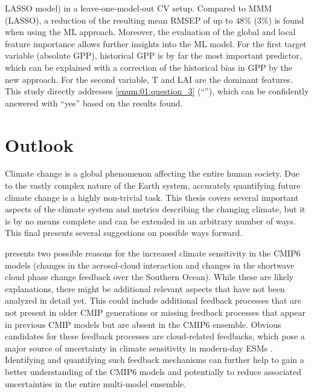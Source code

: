 \ac{LASSO} model) in a leave‐one‐model‐out \ac{CV} setup. Compared to \ac{MMM}
(\ac{LASSO}), a reduction of the resulting mean \ac{RMSEP} of up to $48
\unit{\%}$ ($3 \unit{\%}$) is found when using the \ac{ML} approach. Moreover,
the evaluation of the global and local feature importance allows further
insights into the \ac{ML} model. For the first target variable (absolute
\ac{GPP}), historical \ac{GPP} is by far the most important predictor, which
can be explained with a correction of the historical bias in \ac{GPP} by the
new approach. For the second variable, \ac{T} and \ac{LAI} are the dominant
features. This study directly addresses \cref{enum:01:question_3}
(\enquote{\emph{\KeyScienceQuestionThree{}}}), which can be confidently
answered with \enquote{yes} based on the results found.


\section{Outlook}
\label{sec:07:outlook}

Climate change is a global phenomenon affecting the entire human society. Due
to the vastly complex nature of the Earth system, accurately quantifying future
climate change is a highly non-trivial task. This thesis covers several
important aspects of the climate system and metrics describing the changing
climate, but it is by no means complete and can be extended in an arbitrary
number of ways. This final  presents several
suggestions on possible ways forward.

 presents two possible reasons for the
increased climate sensitivity in the \acs{CMIP}6 models (changes in the
aerosol-cloud interaction and changes in the shortwave cloud phase change
feedback over the Southern Ocean). While these are likely explanations, there
might be additional relevant aspects that have not been analyzed in detail yet.
This could include additional feedback processes that are not present in older
\ac{CMIP} generations or missing feedback processes that appear in previous
\ac{CMIP} models but are absent in the \acs{CMIP}6 ensemble. Obvious candidates
for these feedback processes are cloud-related feedbacks, which pose a major
source of uncertainty in climate sensitivity in modern-day \acp{ESM}
\autocite{Boucher2013}. Identifying and quantifying such feedback mechanisms
can further help to gain a better understanding of the \acs{CMIP}6 models and
potentially to reduce associated uncertainties in the entire multi-model
ensemble.

